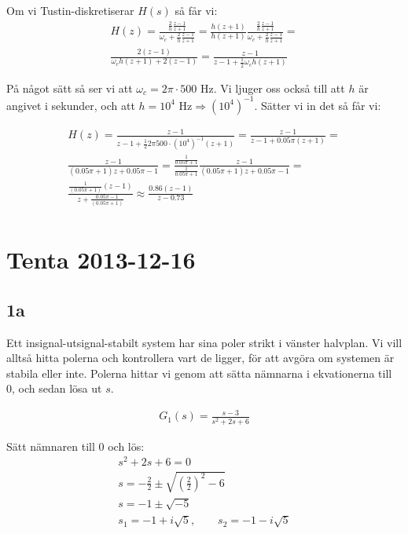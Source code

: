 \documentclass[a4paper]{article}
\newcommand{\oklarhet}[1]{%
  \noindent\fbox{\parbox[b][2em][t]{\textwidth}{\color{red}#1} }%
}
\begin{document}
Om vi Tustin-diskretiserar $H(s)$ så får vi:
\begin{align*}
  H(z) = \frac{\frac{2}{h} \frac{z - 1}{z + 1}}{\omega_c + \frac{2}{h} \frac{z - 1}{z + 1}} = \frac{h(z+1)}{h(z+1)} \frac{\frac{2}{h} \frac{z - 1}{z + 1}}{\omega_c + \frac{2}{h} \frac{z - 1}{z + 1}} = \\
  \frac{2(z - 1)}{\omega_c h (z+1) + 2(z-1)} = \frac{z-1}{z-1 + \frac{1}{2} \omega_c h (z+1)}
\end{align*}

På något sätt så ser vi att $\omega_c = 2\pi \cdot 500$ Hz. Vi ljuger oss också till att $h$ är angivet i sekunder, och att $h = 10^4 \text{ Hz} \Rightarrow (10^4)^{-1}$. Sätter vi in det så får vi:\\
\oklarhet{Hur gick det till?}

\begin{align*}
  H(z) = \frac{z-1}{z-1 + \frac{1}{2} 2\pi 500 \cdot (10^4)^{-1} (z+1)} = \frac{z-1}{z-1 + 0.05 \pi (z+1)} = \\
  \frac{z-1}{(0.05\pi + 1)z + 0.05 \pi -1} = \frac{\frac{1}{0.05\pi + 1}}{\frac{1}{0.05\pi + 1}}\frac{z-1}{(0.05\pi + 1)z + 0.05 \pi -1} = \\
  \frac{\frac{1}{(0.05\pi + 1)}(z-1)}{z + \frac{0.05 \pi -1}{(0.05\pi + 1)}} \approx \frac{0.86(z-1)}{z-0.73}\\
\end{align*}

\section{Tenta 2013-12-16}
\subsection{1a}
Ett insignal-utsignal-stabilt system har sina poler strikt i vänster halvplan. Vi vill alltså hitta polerna och kontrollera vart de ligger, för att avgöra om systemen är stabila eller inte. Polerna hittar vi genom att sätta nämnarna i ekvationerna till 0, och sedan lösa ut $s$.

\begin{align*}
  G_1(s) = \frac{s-3}{s^2+2s+6}
\end{align*}

Sätt nämnaren till 0 och lös:
\begin{align*}
  s^2+2s+6 = 0\\
  s = -\frac{2}{2} \pm \sqrt{\left(\frac{2}{2}\right)^2 -6}\\
  s = -1 \pm \sqrt{-5}\\
  s_1 = -1 + i\sqrt{5}, \qquad s_2 = -1 - i\sqrt{5}
\end{align*}
\end{document}
